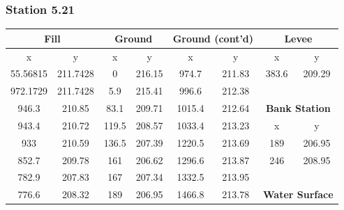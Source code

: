 \subsubsection{Station 5.21}
\begin{center}

\begin{tabular}{|cccc||cc||cc|} 
    \hline
    \multicolumn{2}{|c}{\textbf{Fill }} & \multicolumn{2}{c||}{\textbf{Ground }} & \multicolumn{2}{c||}{\textbf{Ground (cont'd)}} & \multicolumn{2}{c|}{\textbf{Levee }}           \\ 
    \hline
    x        & y                        & x     & y                             & x      & y                            & x        & y                                   \\
    55.56815 & 211.7428                 & 0     & 216.15                        & 974.7  & 211.83                       & 383.6    & 209.29                              \\
    972.1729 & 211.7428                 & 5.9   & 215.41                        & 996.6  & 212.38                       &          &                                     \\
    946.3    & 210.85                   & 83.1  & 209.71                        & 1015.4 & 212.64                       & \multicolumn{2}{c|}{\textbf{Bank Station }}    \\ 
    \cline{7-8}
    943.4    & 210.72                   & 119.5 & 208.57                        & 1033.4 & 213.23                       & x        & y                                   \\
    933      & 210.59                   & 136.5 & 207.39                        & 1220.5 & 213.69                       & 189      & 206.95                              \\
    852.7    & 209.78                   & 161   & 206.62                        & 1296.6 & 213.87                       & 246      & 208.95                              \\
    782.9    & 207.83                   & 167   & 207.34                        & 1332.5 & 213.95                       &          &                                     \\
    776.6    & 208.32                   & 189   & 206.95                        & 1466.8 & 213.78                       & \multicolumn{2}{c|}{\textbf{Water Surface }}   \\ 

\end{tabular}
\end{center}
